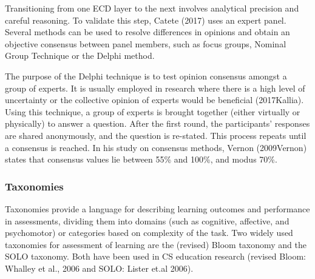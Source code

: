 Transitioning from one ECD layer to the next involves analytical precision and careful reasoning. To validate this step, Catete (2017) uses an expert panel. Several methods can be used to resolve differences in opinions and obtain an objective consensus between panel members, such as focus groups, Nominal Group Technique or the Delphi method.

The purpose of the Delphi technique is to test opinion consensus amongst a group of experts. It is usually employed in research where there is a high level of uncertainty or the collective opinion of
experts would be beneficial (2017Kallia). Using this technique, a group of experts is brought together (either virtually or physically) to answer a question. After the first round, the participants' responses are shared anonymously, and the question is re-stated. This process repeats until a consensus is reached. In his study on consensus methods, Vernon (2009Vernon) states that consensus values lie between 55\% and 100\%, and modus 70\%.





\subsubsection*{Taxonomies}

Taxonomies provide a language for describing learning outcomes and
performance in assessments, dividing them into domains (such as cognitive, affective, and psychomotor) or categories based on complexity of the task. Two widely used taxonomies for assessment of learning are the (revised) Bloom
taxonomy and the SOLO taxonomy. Both have been used in CS education research (revised Bloom: Whalley et al., 2006 and SOLO: Lister et.al 2006).


